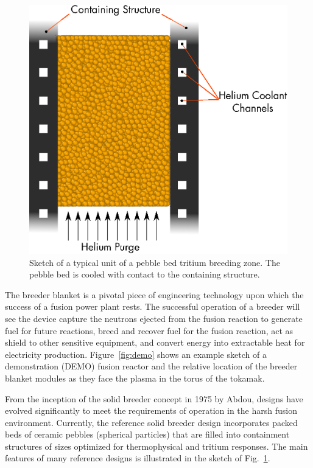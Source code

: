 \begin{figure}[ht]
	\centering
	\includegraphics[width=\singleimagewidth]{chapters/figures/solid_breeder_sketch} 
	\caption{Sketch of a typical unit of a pebble bed tritium breeding zone. The pebble bed is cooled with contact to the containing structure.}
	\label{fig:solid-breeder-sketch}
\end{figure}

The breeder blanket is a pivotal piece of engineering technology upon which the success of a fusion power plant rests. The successful operation of a breeder will see the device capture the neutrons ejected from the fusion reaction to generate fuel for future reactions, breed and recover fuel for the fusion reaction, act as shield to other sensitive equipment, and convert energy into extractable heat for electricity production. Figure~\ref{fig:demo} shows an example sketch of a demonstration (DEMO) fusion reactor and the relative location of the breeder blanket modules as they face the plasma in the torus of the tokamak. 

From the inception of the solid breeder concept in 1975 by Abdou\etal\cite{Abdou1975c}, designs have evolved significantly to meet the requirements of operation in the harsh fusion environment. Currently, the reference solid breeder design incorporates packed beds of ceramic pebbles (spherical particles) that are filled into containment structures of sizes optimized for thermophysical and tritium responses. The main features of many reference designs is illustrated in the sketch of Fig.~\ref{fig:solid-breeder-sketch}.


